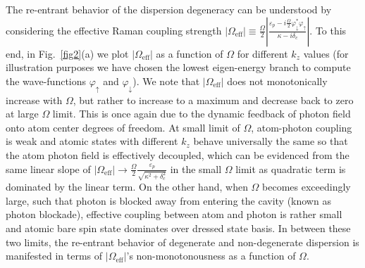\documentclass[atoms,article,submit,moreauthors,pdftex,12pt,a4paper]{mdpi}
\begin{document}
The re-entrant behavior of the dispersion degeneracy can be understood by considering the effective Raman coupling strength $|\Omega_\text{eff}|\equiv\frac{\Omega}{2}\left|\frac{\varepsilon_{p}-i\frac{\Omega}{2}\varphi_\downarrow^\ast\varphi_\uparrow}{\kappa-i\delta_{c}}\right|$. To this end, in Fig.~\ref{fig2}(a) we plot $|\Omega_\text{eff}|$ as a function of $\Omega$ for different $k_z$ values (for illustration purposes we have chosen the lowest eigen-energy branch to compute the wave-functions $\varphi_\uparrow$ and $\varphi_\downarrow$). We note that $|\Omega_\text{eff}|$ does not monotonically increase with $\Omega$, but rather to increase to a maximum and decrease back to zero at large $\Omega$ limit. This is once again due to the dynamic feedback of photon field onto atom center degrees of freedom. At small limit of $\Omega$, atom-photon coupling is weak and atomic states with different $k_z$ behave universally the same so that the atom photon field is effectively decoupled, which can be evidenced from the same linear slope of $|\Omega_\text{eff}|\rightarrow\frac{\Omega}{2}\frac{\varepsilon_p}{\sqrt{\kappa^2+\delta_c^2}}$ in the small $\Omega$ limit as quadratic term is dominated by the linear term. On the other hand, when $\Omega$ becomes exceedingly large, such that photon is blocked away from entering the cavity (known as photon blockade), effective coupling between atom and photon is rather small and atomic bare spin state dominates over dressed state basis. In between these two limits, the re-entrant behavior of degenerate and non-degenerate dispersion is manifested in terms of $|\Omega_\text{eff}|$'s non-monotonousness as a function of $\Omega$.

\end{document}
